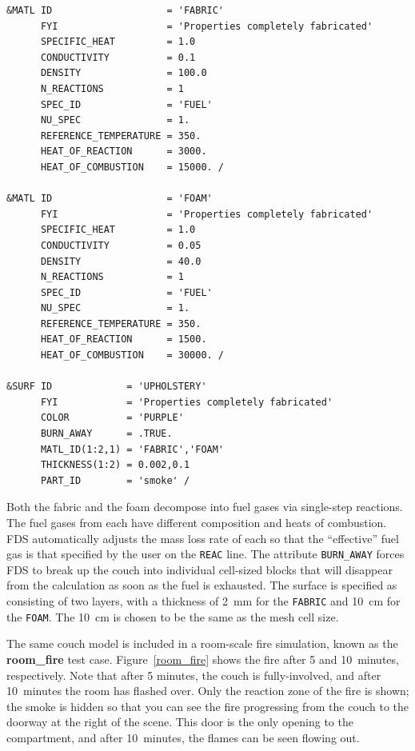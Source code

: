 \documentclass[11pt]{book}
\newcommand{\ct}{\tt\small}
\begin{document}
\footnotesize
\begin{verbatim}
&MATL ID                    = 'FABRIC'
      FYI                   = 'Properties completely fabricated'
      SPECIFIC_HEAT         = 1.0
      CONDUCTIVITY          = 0.1
      DENSITY               = 100.0
      N_REACTIONS           = 1
      SPEC_ID               = 'FUEL'
      NU_SPEC               = 1.
      REFERENCE_TEMPERATURE = 350.
      HEAT_OF_REACTION      = 3000.
      HEAT_OF_COMBUSTION    = 15000. /

&MATL ID                    = 'FOAM'
      FYI                   = 'Properties completely fabricated'
      SPECIFIC_HEAT         = 1.0
      CONDUCTIVITY          = 0.05
      DENSITY               = 40.0
      N_REACTIONS           = 1
      SPEC_ID               = 'FUEL'
      NU_SPEC               = 1.
      REFERENCE_TEMPERATURE = 350.
      HEAT_OF_REACTION      = 1500.
      HEAT_OF_COMBUSTION    = 30000. /

&SURF ID             = 'UPHOLSTERY'
      FYI            = 'Properties completely fabricated'
      COLOR          = 'PURPLE'
      BURN_AWAY      = .TRUE.
      MATL_ID(1:2,1) = 'FABRIC','FOAM'
      THICKNESS(1:2) = 0.002,0.1
      PART_ID        = 'smoke' /
\end{verbatim} \normalsize

\noindent
Both the fabric and the foam decompose into fuel gases via
single-step reactions. The fuel gases from each have different
composition and heats of combustion. FDS automatically adjusts
the mass loss rate of each so that the ``effective'' fuel gas
is that specified by the user on the {\ct REAC} line. The attribute
{\ct BURN\_AWAY} forces FDS to break up the couch into
individual cell-sized blocks that will disappear from the calculation
as soon as the fuel is exhausted. The surface is specified
as consisting of two layers, with a thickness of 2~mm for the {\ct FABRIC}
and 10~cm for the {\ct FOAM}. The 10~cm is chosen to be the
same as the mesh cell size.

The same couch model is included in a room-scale fire simulation, known as the
{\bf room\_fire} test case. Figure~\ref{room_fire} shows the fire after 5 and 10~minutes, respectively.
Note that after 5 minutes, the couch is fully-involved, and after 10~minutes the room has flashed over.
Only the reaction zone of the fire is shown; the smoke is hidden so that you can see the fire progressing
from the couch to the doorway at the right of the scene. This door is the only opening to the compartment,
and after 10~minutes, the flames can be seen flowing out.
\end{document}
